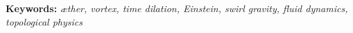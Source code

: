 \documentclass[a4paper,12pt]{article}
\begin{document}
\vfill
\noindent\textbf{Keywords:} \textit{æther, vortex, time dilation, Einstein, swirl gravity, fluid dynamics, topological physics}

\newpage


    
    
    

    \appendix \label{sec:Appendix}
        
        
        

    
    
\end{document}
